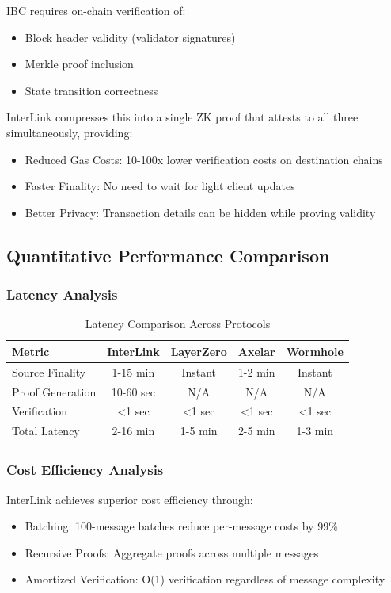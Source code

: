 \documentclass[11pt,a4paper]{article}
\begin{document}
IBC requires on-chain verification of:
\begin{itemize}
    \item Block header validity (validator signatures)
    \item Merkle proof inclusion
    \item State transition correctness
\end{itemize}

InterLink compresses this into a single ZK proof that attests to all three simultaneously, providing:
\begin{itemize}
    \item Reduced Gas Costs: 10-100x lower verification costs on destination chains
    \item Faster Finality: No need to wait for light client updates
    \item Better Privacy: Transaction details can be hidden while proving validity
\end{itemize}

\subsection{Quantitative Performance Comparison}

\subsubsection{Latency Analysis}

\begin{table}[H]
\centering
\begin{tabular}{@{}lcccc@{}}
\toprule
Metric & InterLink & LayerZero & Axelar & Wormhole \\ \midrule
Source Finality & 1-15 min & Instant & 1-2 min & Instant \\
Proof Generation & 10-60 sec & N/A & N/A & N/A \\
Verification & <1 sec & <1 sec & <1 sec & <1 sec \\
Total Latency & 2-16 min & 1-5 min & 2-5 min & 1-3 min \\
\end{tabular}
\caption{Latency Comparison Across Protocols}
\end{table}

\subsubsection{Cost Efficiency Analysis}

InterLink achieves superior cost efficiency through:
\begin{itemize}
    \item Batching: 100-message batches reduce per-message costs by 99\%
    \item Recursive Proofs: Aggregate proofs across multiple messages
    \item Amortized Verification: O(1) verification regardless of message complexity
\end{itemize}
\end{document}
